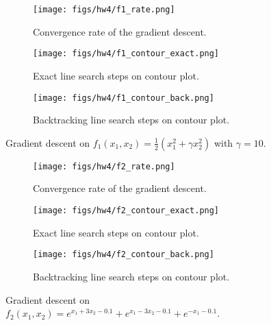 \documentclass[12pt, letterpaper, twoside]{article}
\begin{document}
\begin{figure}[h]
     \centering
     \begin{subfigure}[b]{0.49\textwidth}
         \centering
         \texttt{[image: figs/hw4/f1\_rate.png]}
         \caption{Convergence rate of the gradient descent.}
     \end{subfigure}
     \hfill
     \begin{subfigure}[b]{0.49\textwidth}
         \centering
         \texttt{[image: figs/hw4/f1\_contour\_exact.png]}
         \caption{Exact line search steps on contour plot.}
     \end{subfigure}
     \hfill
     \begin{subfigure}[b]{0.49\textwidth}
         \centering
         \texttt{[image: figs/hw4/f1\_contour\_back.png]}
         \caption{Backtracking line search steps on contour plot.}
     \end{subfigure}
        \caption{Gradient descent on $f_1(x_1,x_2)=\frac{1}{2}(x_1^2+\gamma x_2^2)$ with $\gamma=10$.}
\end{figure}

\begin{figure}[h]
     \centering
     \begin{subfigure}[b]{0.49\textwidth}
         \centering
         \texttt{[image: figs/hw4/f2\_rate.png]}
         \caption{Convergence rate of the gradient descent.}
     \end{subfigure}
     \hfill
     \begin{subfigure}[b]{0.49\textwidth}
         \centering
         \texttt{[image: figs/hw4/f2\_contour\_exact.png]}
         \caption{Exact line search steps on contour plot.}
     \end{subfigure}
     \hfill
     \begin{subfigure}[b]{0.49\textwidth}
         \centering
         \texttt{[image: figs/hw4/f2\_contour\_back.png]}
         \caption{Backtracking line search steps on contour plot.}
     \end{subfigure}
        \caption{Gradient descent on $f_2(x_1,x_2)=e^{x_1+3x_2-0.1}+e^{x_1-3x_2-0.1}+e^{-x_1-0.1}$.}
\end{figure}
\end{document}
